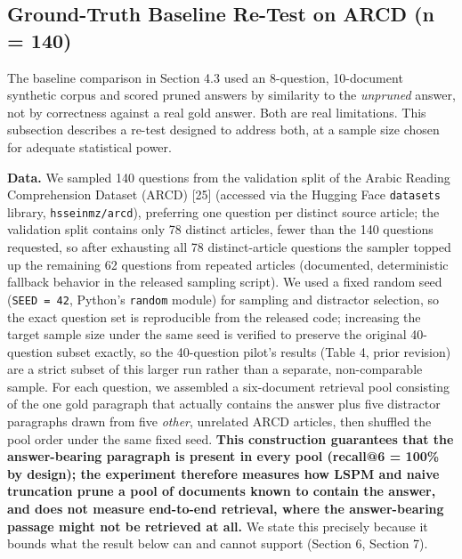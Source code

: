 \subsection{Ground-Truth Baseline Re-Test on ARCD (n = 140)}
The baseline comparison in Section 4.3 used an 8-question, 10-document synthetic corpus and scored pruned answers by similarity to the \textit{unpruned} answer, not by correctness against a real gold answer. Both are real limitations. This subsection describes a re-test designed to address both, at a sample size chosen for adequate statistical power.

\textbf{Data.} We sampled 140 questions from the validation split of the Arabic Reading Comprehension Dataset (ARCD) [25] (accessed via the Hugging Face \texttt{datasets} library, \texttt{hsseinmz/arcd}), preferring one question per distinct source article; the validation split contains only 78 distinct articles, fewer than the 140 questions requested, so after exhausting all 78 distinct-article questions the sampler topped up the remaining 62 questions from repeated articles (documented, deterministic fallback behavior in the released sampling script). We used a fixed random seed (\texttt{SEED = 42}, Python's \texttt{random} module) for sampling and distractor selection, so the exact question set is reproducible from the released code; increasing the target sample size under the same seed is verified to preserve the original 40-question subset exactly, so the 40-question pilot's results (Table 4, prior revision) are a strict subset of this larger run rather than a separate, non-comparable sample. For each question, we assembled a six-document retrieval pool consisting of the one gold paragraph that actually contains the answer plus five distractor paragraphs drawn from five \textit{other}, unrelated ARCD articles, then shuffled the pool order under the same fixed seed. \textbf{This construction guarantees that the answer-bearing paragraph is present in every pool (recall@6 = 100\% by design); the experiment therefore measures how LSPM and naive truncation prune a pool of documents known to contain the answer, and does not measure end-to-end retrieval, where the answer-bearing passage might not be retrieved at all.} We state this precisely because it bounds what the result below can and cannot support (Section 6, Section 7).

